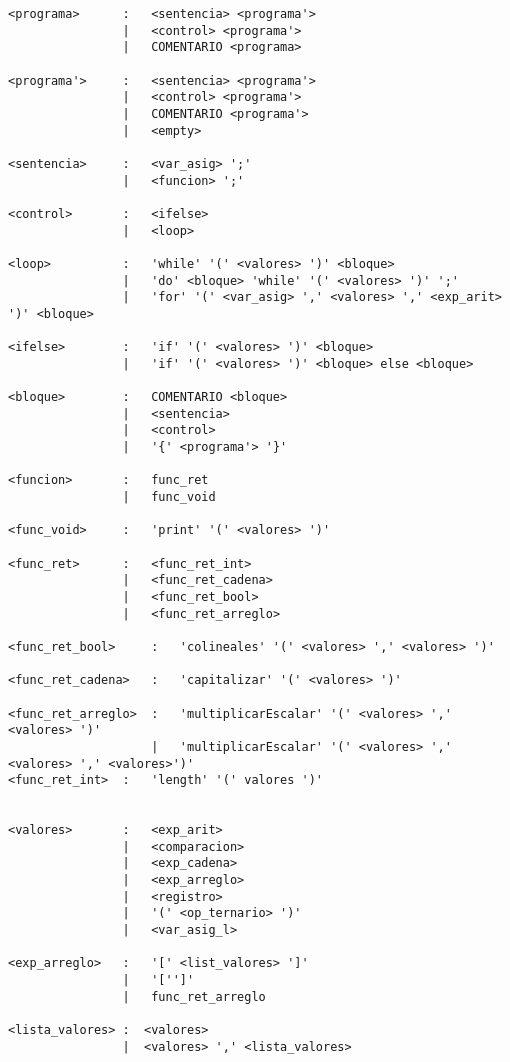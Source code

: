 \begin{verbatim}
<programa>      :   <sentencia> <programa'>   
                |   <control> <programa'>   
                |   COMENTARIO <programa>   

<programa'>     :   <sentencia> <programa'>   
                |   <control> <programa'>   
                |   COMENTARIO <programa'>   
                |   <empty>

<sentencia>     :   <var_asig> ';'
                |   <funcion> ';'

<control>       :   <ifelse>
                |   <loop>

<loop>          :   'while' '(' <valores> ')' <bloque>
                |   'do' <bloque> 'while' '(' <valores> ')' ';' 
                |   'for' '(' <var_asig> ',' <valores> ',' <exp_arit> ')' <bloque>

<ifelse>        :   'if' '(' <valores> ')' <bloque>
                |   'if' '(' <valores> ')' <bloque> else <bloque>

<bloque>        :   COMENTARIO <bloque>
                |   <sentencia>
                |   <control>
                |   '{' <programa'> '}'

<funcion>       :   func_ret
                |   func_void

<func_void>     :   'print' '(' <valores> ')'

<func_ret>      :   <func_ret_int>
                |   <func_ret_cadena>
                |   <func_ret_bool>
                |   <func_ret_arreglo>

<func_ret_bool>     :   'colineales' '(' <valores> ',' <valores> ')'

<func_ret_cadena>   :   'capitalizar' '(' <valores> ')'

<func_ret_arreglo>  :   'multiplicarEscalar' '(' <valores> ',' <valores> ')'
                    |   'multiplicarEscalar' '(' <valores> ',' <valores> ',' <valores>')'
<func_ret_int>  :   'length' '(' valores ')'


<valores>       :   <exp_arit>
                |   <comparacion>
                |   <exp_cadena>
                |   <exp_arreglo>
                |   <registro>
                |   '(' <op_ternario> ')'
                |   <var_asig_l>

<exp_arreglo>   :   '[' <list_valores> ']'
                |   '['']'
                |   func_ret_arreglo

<lista_valores> :  <valores>
                |  <valores> ',' <lista_valores>


\end{verbatim}
